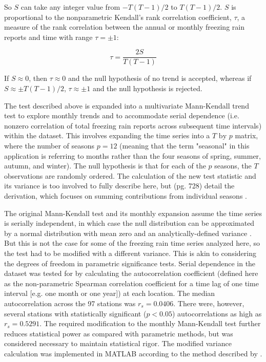 \documentclass[twocol]{ametsoc}
\begin{document}
So $S$ can take any integer value from $-T(T-1)/2$ to $T(T-1)/2$. $S$ is proportional to the nonparametric Kendall's rank correlation coefficient, $\tau$, a measure of the rank correlation between the annual or monthly freezing rain reports and time with range $\tau=\pm1$:

\[\tau=\frac{2S}{T(T-1)}\]

If $S\approx0$, then $\tau\approx0$ and the null hypothesis of no trend is accepted, whereas if  $S\approx\pm T(T-1)/2$, $\tau\approx\pm1$ and the null hypothesis is rejected. 

The test described above is expanded into a multivariate Mann-Kendall trend test to explore monthly trends and to accommodate serial dependence (i.e. nonzero correlation of total freezing rain reports across subsequent time intervals) within the dataset. This involves expanding the time series into a $T\text{ by }p$ matrix, where the number of seasons $p=12$ (meaning that the term "seasonal" in this application is referring to months rather than the four seasons of spring, summer, autumn, and winter). The null hypothesis is that for each of the $p$ seasons, the $T$ observations are randomly ordered. The calculation of the new test statistic and its variance is too involved to fully describe here, but \citet{hirsch1984nonparametric} (pg. 728) detail the derivation, which focuses on summing contributions from individual seasons .

The original Mann-Kendall test and its monthly expansion assume the time series is serially independent, in which case the null distribution can be approximated by a normal distribution with mean zero and an analytically-defined variance \citep{kendall1955rank}. But this is not the case for some of the freezing rain time series analyzed here, so the test had to be modified with a different variance. This is akin to considering the degrees of freedom in parametric significance tests. Serial dependence in the dataset was tested for by calculating the autocorrelation coefficient (defined here as the non-parametric Spearman correlation coefficient for a time lag of one time interval [e.g. one month or one year]) at each location. The median autocorrelation across the 97 stations was $r_s = 0.0406$. There were, however, several stations with statistically significant ($p<0.05$) autocorrelations as high as $r_s = 0.5291$. The required modification to the monthly Mann-Kendall test further reduces statistical power as compared with parametric methods, but was considered necessary to maintain statistical rigor. The modified variance calculation was implemented in MATLAB according to the method described by \citet{hirsch1984nonparametric}. 
\end{document}
